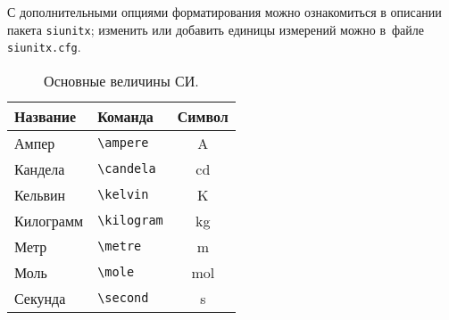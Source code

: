 С дополнительными опциями форматирования можно ознакомиться в описании пакета \texttt{siunitx};
изменить или добавить единицы измерений можно в~файле \texttt{siunitx.cfg}.

\begin{table}
    \caption{Основные величины СИ.}\label{tab:unit:base}
    \centering
    \begin{tabular}{llc}
        \toprule
        Название  & Команда                & Символ         \\
        \midrule
        Ампер     & \verb|\ampere| & \si{\ampere}   \\
        Кандела   & \verb|\candela| & \si{\candela}  \\
        Кельвин   & \verb|\kelvin| & \si{\kelvin}   \\
        Килограмм & \verb|\kilogram| & \si{\kilogram} \\
        Метр      & \verb|\metre| & \si{\metre}    \\
        Моль      & \verb|\mole| & \si{\mole}     \\
        Секунда   & \verb|\second| & \si{\second}   \\
        \bottomrule
    \end{tabular}
\end{table}

